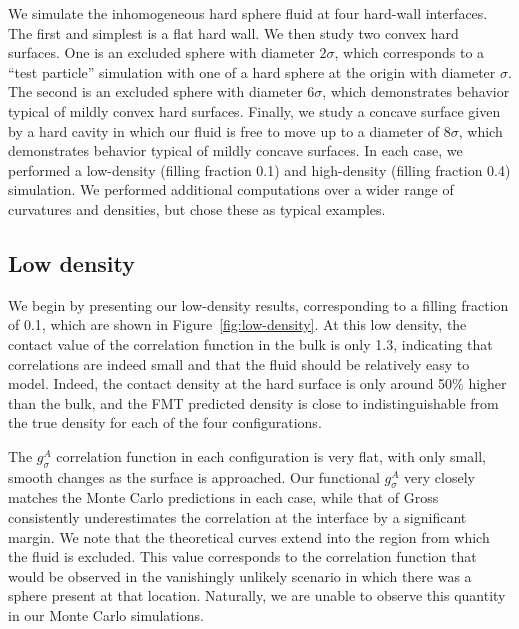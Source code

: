 \documentclass[letterpaper,twocolumn,amsmath,amssymb,pre]{revtex4-1}
\begin{document}
We simulate the inhomogeneous hard sphere fluid at four hard-wall
interfaces.  The first and simplest is a flat hard wall.  We
then study two convex hard surfaces.  One is an excluded sphere with
diameter $2\sigma$, which corresponds to a ``test particle''
simulation with one of a hard sphere at the origin with diameter
$\sigma$.  The
second is an excluded sphere with diameter $6\sigma$,
which demonstrates behavior typical of mildly convex hard surfaces.
Finally, we study a concave surface given by a hard cavity in which
our fluid is free to move up to a diameter of $8\sigma$, which
demonstrates behavior typical of mildly concave surfaces.  In each
case, we performed a low-density (filling fraction 0.1) and high-density
(filling fraction 0.4) simulation.  We performed additional
computations over a wider range of curvatures and densities, but
chose these as typical examples.



\subsection{Low density}

We begin by presenting our low-density results, corresponding to a
filling fraction of 0.1, which are shown in
Figure~\ref{fig:low-density}.  At this low density,
the contact value of the correlation function in the bulk is only 1.3,
indicating that correlations are indeed small and that the fluid should be
relatively easy to model.  Indeed, the contact density at the hard
surface is only around 50\% higher than the bulk, and the FMT
predicted density is close to indistinguishable from the true
density for each of the four configurations.


The $g_\sigma^A$ correlation function in each configuration is very
flat, with only small, smooth changes as the surface is approached.
Our functional $g_\sigma^A$ very closely matches the Monte Carlo
predictions in each case, while that of Gross consistently
underestimates the correlation at the interface by a significant margin.  We note that the theoretical curves
extend into the region from which the fluid is excluded.  This value
corresponds to the correlation function that would be observed in the
vanishingly unlikely scenario in which there was a sphere present at
that location.  Naturally, we are unable to observe this quantity in
our Monte Carlo simulations.
\end{document}
